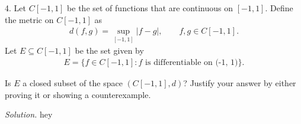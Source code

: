 \documentclass{article}
\begin{document}
\newpage

4. Let $C[-1, 1]$ be the set of functions that are continuous on $[-1,
   1]$. Define the metric on $C[-1, 1]$ as
%
\begin{align*}
    d(f, g) =  \sup_{[-1, 1]} |f - g|,
    \qquad
    f, g \in C[-1, 1].
\end{align*}
%
Let $E \subseteq C[-1, 1]$ be the set given by
%
\begin{align*}
   E = \{f \in C[-1, 1] : \text{$f$ is differentiable on (-1, 1)}\}.
\end{align*}

Is $E$ a closed subset of the space $(C[-1, 1], d)$? Justify your answer
by either proving it or showing a counterexample.

\textit{Solution.}
hey
\end{document}
